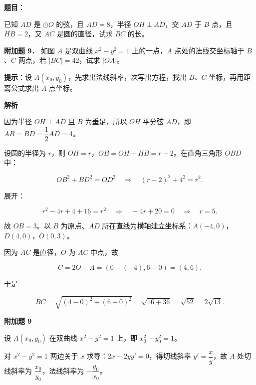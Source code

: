 \begin{answer}

\textbf{题目}：

已知 $AD$ 是 $\odot O$ 的弦，且 $AD=8$，半径 $OH\perp AD$，交 $AD$ 于 $B$ 点，且 $HB=2$，又 $AC$ 是圆的直径，试求 $BC$ 的长。
\nopagebreak[4]
\begin{center}\end{center}
\nopagebreak[4]
\textbf{附加题 9．} 如图 $A$ 是双曲线 $x^2-y^2=1$ 上的一点，$A$ 点处的法线交坐标轴于 $B$、$C$ 两点，若 $|BC|=42$，试求 $|OA|$。

\begin{gktip}
\textbf{提示}：设 $A(x_0,y_0)$，先求出法线斜率，次写出方程，找出 $B$、$C$ 坐标，再用距离公式求出 $A$ 点坐标。
\end{gktip}
\nopagebreak[4]
\begin{center}\end{center}
\nopagebreak[4]
\textbf{解析}

因为半径 $OH\perp AD$ 且 $B$ 为垂足，所以 $OH$ 平分弦 $AD$，即 $AB=BD=\dfrac12AD=4$。

设圆的半径为 $r$，则 $OH=r$，$OB=OH-HB=r-2$。在直角三角形 $OBD$ 中：

\nopagebreak[4]
\[
OB^2+BD^2=OD^2
\quad\Longrightarrow\quad
(r-2)^2+4^2=r^2.
\]

展开：

\nopagebreak[4]
\[
r^2-4r+4+16=r^2
\quad\Longrightarrow\quad
-4r+20=0
\quad\Longrightarrow\quad
r=5.
\]

故 $OB=3$。以 $B$ 为原点、$AD$ 所在直线为横轴建立坐标系：$A(-4,0)$，$D(4,0)$，$O(0,3)$。

因为 $AC$ 是直径，$O$ 为 $AC$ 中点，故

\nopagebreak[4]
\[
C=2O-A=(0-(-4),6-0)=(4,6).
\]

于是

\nopagebreak[4]
\[
BC=\sqrt{(4-0)^2+(6-0)^2}=\sqrt{16+36}=\sqrt{52}=2\sqrt{13}.
\]

\textbf{附加题 9}

设 $A(x_0,y_0)$ 在双曲线 $x^2-y^2=1$ 上，即 $x_0^2-y_0^2=1$。

对 $x^2-y^2=1$ 两边关于 $x$ 求导：$2x-2yy'=0$，得切线斜率 $y'=\dfrac xy$，故 $A$ 处切线斜率为 $\dfrac{x_0}{y_0}$，法线斜率为 $-\dfrac{y_0}{x_0}$。


\end{answer}
